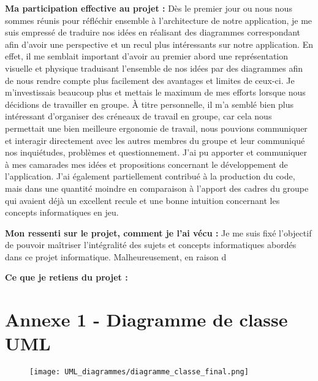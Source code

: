 \documentclass[11pt]{article}
\begin{document}
\textbf{ Ma participation effective au projet : }
Dès le premier jour ou nous nous sommes réunis pour réfléchir ensemble à l'architecture de notre application, je me suis empressé de traduire nos idées en réalisant des diagrammes correspondant afin d'avoir une perspective et un recul plus intéressants sur notre application. En effet, il me semblait important d'avoir au premier abord une représentation visuelle et physique traduisant l'ensemble de nos idées par des diagrammes afin de nous rendre compte plus facilement des avantages et limites de ceux-ci. 
Je m'investissais beaucoup plus et mettais le maximum de mes efforts lorsque nous décidions de travailler en groupe. À titre personnelle, il m'a semblé bien plus intéressant d'organiser des créneaux de travail en groupe, car cela nous permettait une bien meilleure ergonomie de travail, nous pouvions communiquer et interagir directement avec les autres membres du groupe et leur communiqué nos inquiétudes, problèmes et questionnement.
J'ai pu apporter et communiquer à mes camarades mes idées et propositions concernant le développement de l'application. J'ai également partiellement contribué à la production du code, mais dans une quantité moindre en comparaison à l'apport des cadres du groupe qui avaient déjà un excellent recule et une bonne intuition concernant les concepts informatiques en jeu.

\textbf{ Mon ressenti sur le projet, comment je l’ai vécu :  }
Je me suis fixé l'objectif de pouvoir maîtriser l'intégralité des sujets et concepts informatiques abordés dans ce projet informatique. Malheureusement, en raison d

\textbf{ Ce que je retiens du projet :   }


\appendix  %

\section*{Annexe 1 - Diagramme de classe UML}

\begin{figure}[H]
    \label{UML_classes}
    \centering
    \texttt{[image: UML\_diagrammes/diagramme\_classe\_final.png]}
\end{figure}



\restoregeometry


\restoregeometry
\end{document}
